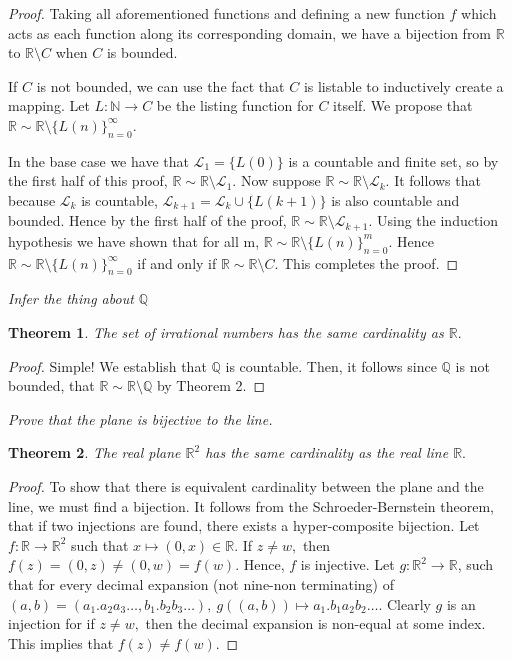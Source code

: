 \documentclass[letter]{article}
\newtheorem{theorem}{Theorem}
\newenvironment{menumerate}{%
  \edef\backupindent{\the\parindent}%
  \enumerate%
  \setlength{\parindent}{\backupindent}%
}{\endenumerate}
\begin{document}
\begin{menumerate}
\begin{menumerate}
\begin{proof}
 			 		 Taking all aforementioned functions and defining a new function $f$ which acts as each function along its corresponding domain, we have a bijection from $\mathbb{R}$ to $\mathbb{R}\setminus C$ when $C$ is bounded. 

 			 		 If $C$ is not bounded, we can use the fact that $C$ is listable to inductively create a mapping. Let $L:\mathbb{N}\to C$ be the listing function for $C$ itself. We propose that $\mathbb{R} \sim \mathbb{R} \setminus \{L(n)\}_{n=0}^\infty$.

 			 		 In the base case we have that $\mathcal{L}_1 = \{L(0)\}$ is a countable and finite set, so by the first half of this proof, $\mathbb{R} \sim \mathbb{R} \setminus \mathcal{L}_1.$ Now suppose $\mathbb{R} \sim \mathbb{R} \setminus \mathcal{L}_k.$ It follows that because $\mathcal{L}_k$ is countable, $\mathcal{L}_{k+1} = \mathcal{L}_k \cup \{L(k+1)\}$ is also countable and bounded. Hence by the first half of the proof, $\mathbb{R} \sim \mathbb{R} \setminus \mathcal{L}_{k+1}$.
					 Using the induction hypothesis we have shown that for all m, $\mathbb{R} \sim \mathbb{R} \setminus \{L(n)\}_{n=0}^m$. Hence $\mathbb{R} \sim \mathbb{R} \setminus \{L(n)\}_{n=0}^\infty$ if and only if  $\mathbb{R} \sim \mathbb{R} \setminus C$. This completes the proof.

	 		  \end{proof}

	 		  \item \textit{Infer the thing about $\mathbb{Q}$ } 
	 		  	\begin{theorem}
	 		  		The set of irrational numbers has the same cardinality as $\mathbb{R}.$
	 		  	\end{theorem}
	 		  	\begin{proof}
	 		  	Simple! We establish that $\mathbb{Q}$ is countable. Then, it follows since $\mathbb{Q}$ is not bounded, that $\mathbb{R} \sim \mathbb{R} \setminus \mathbb{Q}$ by Theorem 2.
	 		  	\end{proof}
		 \end{menumerate} 
		 \item \textit{Prove that the plane is bijective to the line.}
		 	\begin{theorem}
		 		The real plane $\mathbb{R}^2$ has the same cardinality as the real line $\mathbb{R}.$
		 	\end{theorem}
		 	\begin{proof}
		 		To show that there is equivalent cardinality between the plane and the line, we must find a bijection. It follows from the Schroeder-Bernstein theorem, that if two injections are found, there exists a hyper-composite bijection. Let $f: \mathbb{R} \to \mathbb{R}^2$ such that $x \mapsto (0, x) \in \mathbb{R}.$ If $z\neq w,$ then $f(z) = (0,z) \neq (0,w) = f(w).$ Hence, $f$ is injective. Let $g:\mathbb{R}^2 \to \mathbb{R}$, such that for every decimal expansion (not nine-non terminating) of $(a,b) = (a_1.a_2a_3\dots,b_1.b_2b_3\dots),\  g\left((a,b)\right) \mapsto a_1.b_1a_2b_2\dots.$ Clearly $g$ is an injection for if $z \neq w,$ then the decimal expansion is non-equal at some index. This implies that $f(z) \neq f(w)$.


\end{proof}
\end{menumerate}
\end{document}
